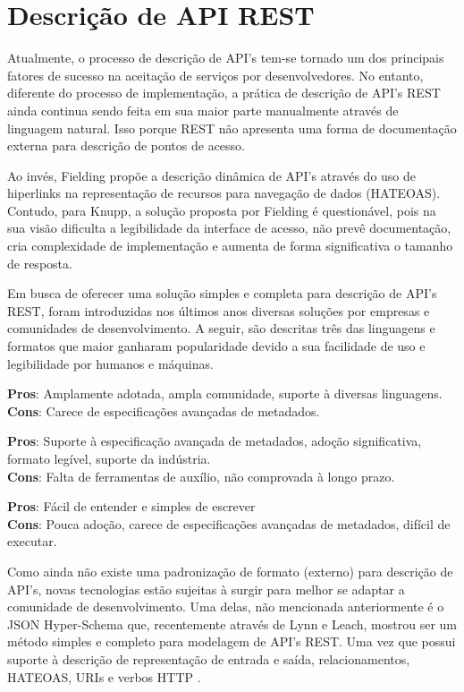 \section[Descrição de API REST]{Descrição de API REST}

Atualmente, o processo de descrição de API's tem-se tornado um dos principais fatores de sucesso na aceitação de serviços por desenvolvedores. No entanto, diferente do processo de implementação, a prática de descrição de API's REST ainda continua sendo feita em sua maior parte manualmente através de linguagem natural. Isso porque REST não apresenta uma forma de documentação externa para descrição de pontos de acesso. \cite{LuckyEtAl2016}

Ao invés, Fielding propõe a descrição dinâmica de API's através do uso de hiperlinks na representação de recursos para navegação de dados (HATEOAS). Contudo, para Knupp, a solução proposta por Fielding é questionável, pois na sua visão dificulta a legibilidade da interface de acesso, não prevê documentação, cria complexidade de implementação e aumenta de forma significativa o tamanho de resposta. \cite{Knupp2016}

Em busca de oferecer uma solução simples e completa para descrição de API's REST, foram introduzidas nos últimos anos diversas soluções por empresas e comunidades de desenvolvimento. A seguir, são descritas três das linguagens e formatos que maior ganharam popularidade devido a sua facilidade de uso e legibilidade por humanos e máquinas. \cite{Sandoval2015}

\begin{description}[leftmargin=8em,style=nextline]
  \item[\textbf{OpenAPI}] \textbf{Pros}: Amplamente adotada, ampla comunidade, suporte à diversas linguagens. \\ \textbf{Cons}: Carece de especificações avançadas de metadados.
  \item[\textbf{RAML}] \textbf{Pros}: Suporte à especificação avançada de metadados, adoção significativa, formato legível, suporte da indústria. \\ \textbf{Cons}: Falta de ferramentas de auxílio, não comprovada à longo prazo.
  \item[\textbf{API Blueprint}] \textbf{Pros}: Fácil de entender e simples de escrever \\ \textbf{Cons}: Pouca adoção, carece de especificações avançadas de metadados, difícil de executar.
\end{description}

Como ainda não existe uma padronização de formato (externo) para descrição de API's, novas tecnologias estão sujeitas à surgir para melhor se adaptar a comunidade de desenvolvimento. Uma delas, não mencionada anteriormente é o JSON Hyper-Schema que, recentemente através de Lynn e Leach, mostrou ser um método simples e completo para modelagem de API's REST. Uma vez que possui suporte à descrição de representação de entrada e saída, relacionamentos, HATEOAS, URIs e verbos HTTP  \cite{LynnEtAl2016} \cite{Leach2014}.
